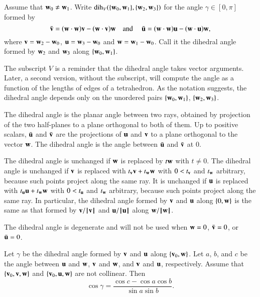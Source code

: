 \begin{definition}\label{def:dih} Assume that ${\mathbf w}_0\ne {\mathbf w}_1$.
Write $\operatorname{dih}_V(\{{\mathbf w}_0,{\mathbf w}_1\},\{{\mathbf w}_2,{\mathbf w}_3\})$ for the angle $\gamma\in[0,\pi]$
formed
by 
    $$
    \bar {{\mathbf v}} = ({\mathbf w}\cdot {\mathbf w}) {\mathbf v} - ({\mathbf w}\cdot {\mathbf v}) {\mathbf w}\quad\text{and }\quad \bar {{\mathbf u}} =
            ({\mathbf w}\cdot {\mathbf w}) {\mathbf u} - ({\mathbf w}\cdot {\mathbf u}) {\mathbf w},
    $$
where ${\mathbf v} = {\mathbf w}_2-{\mathbf w}_0$, ${\mathbf u}={\mathbf w}_3-{\mathbf w}_0$ and ${\mathbf w}={\mathbf w}_1-{\mathbf w}_0$.  Call it
the dihedral angle formed by ${\mathbf w}_2$ and ${\mathbf w}_3$ along $\{{\mathbf w}_0,{\mathbf w}_1\}$.
%
%
\end{definition}
The subscript $V$ is a reminder 
that the dihedral angle takes vector arguments.
Later, a second version, without the subscript, will
compute the angle as a function of the lengths of edges of a 
tetrahedron.
%
%
As the notation suggests, the dihedral angle depends only
on the unordered pairs $\{{\mathbf w}_0,{\mathbf w}_1\}$, $\{{\mathbf w}_2,{\mathbf w}_3\}$.

The dihedral angle is the planar angle between two rays, obtained by projection of the two half-planes to a plane orthogonal to both of them.
Up to positive scalars, $\bar {{\mathbf u}}$ and $\bar {{\mathbf v}}$ are the projections of
${\mathbf u}$ and ${\mathbf v}$ to a plane orthogonal to the vector ${\mathbf w}$.  The
dihedral angle is the angle between $\bar {{\mathbf u}}$ and $\bar {{\mathbf v}}$ at $0$.

The dihedral angle is unchanged if ${\mathbf w}$ is replaced by $t {\mathbf w}$ with
$t\ne0$. The dihedral angle is unchanged if ${\mathbf v}$ is replaced with
$t_{\mathbf v} {\mathbf v} + t_{\mathbf w} {\mathbf w}$ with $0 < t_{\mathbf v}$ and $t_{\mathbf w}$ arbitrary, because such points project along the same ray.  
It is unchanged if
${\mathbf u}$ is replaced with $t_{\mathbf u} {\mathbf u} + t_{\mathbf w} {\mathbf w}$ with $0 < t_{\mathbf u}$ and $t_{\mathbf w}$
arbitrary, because such points project along the same ray.  In particular, the dihedral angle formed by ${\mathbf v}$ and
${\mathbf u}$ along $\{0,{\mathbf w}\}$ is the same as that formed by ${\mathbf v}/{{\hskip0.1em|\hskip-0.15em|\hskip0.1em}{\mathbf v}{\hskip0.1em|\hskip-0.15em|\hskip0.1em}}$ and
${\mathbf u}/{{\hskip0.1em|\hskip-0.15em|\hskip0.1em}{\mathbf u}{\hskip0.1em|\hskip-0.15em|\hskip0.1em}}$ along ${\mathbf w}/{{\hskip0.1em|\hskip-0.15em|\hskip0.1em}{\mathbf w}{\hskip0.1em|\hskip-0.15em|\hskip0.1em}}$.

The dihedral angle is degenerate and will not be used when ${\mathbf w} =
0$, $\bar {{\mathbf v}} = 0$, or $\bar {{\mathbf u}} = 0$.




\begin{lemma}\label{lemma:sloc}
Let $\gamma$ be the dihedral angle formed by ${\mathbf v}$ and ${\mathbf u}$ along
$\{{\mathbf v}_0,{\mathbf w}\}$.  Let $a$, $b$, and $c$ be the
angle between ${\mathbf u}$ and ${\mathbf w}$, ${\mathbf v}$ and ${\mathbf w}$, and ${\mathbf v}$ and
${\mathbf u}$, respectively. %
Assume that $\{{\mathbf v}_0,{\mathbf v},{\mathbf w}\}$ and $\{{\mathbf v}_0,{\mathbf u},{\mathbf w}\}$ are not collinear.
Then
    $$\cos\gamma = \frac{\cos c - \cos a \cos b}{\sin a\sin b}.$$
\end{lemma}
%
%
%

